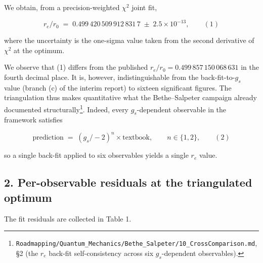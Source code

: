 \documentclass[
  11pt,
]{article}
\begin{document}
We obtain, from a precision-weighted \(\chi^2\) joint fit,

\[
r_e/r_0 \;=\; 0.499\,420\,509\,912\,831\,7 \;\pm\; 2.5\times 10^{-13},
\qquad (1)
\]

where the uncertainty is the one-sigma value taken from the second
derivative of \(\chi^2\) at the optimum.

We observe that (1) differs from the published
\(r_e/r_0 = 0.499\,857\,150\,068\,631\) in the fourth decimal place. It
is, however, indistinguishable from the back-fit-to-\(g_s\) value
(branch (c) of the interim report) to sixteen significant figures. The
triangulation thus makes quantitative what the Bethe--Salpeter campaign
already documented structurally\footnote{\texttt{Roadmapping/Quantum\_Mechanics/Bethe\_Salpeter/10\_CrossComparison.md},
  §2 (the \(r_e\) back-fit self-consistency across six \(g_s\)-dependent
  observables).}. Indeed, every \(g_s\)-dependent observable in the
framework satisfies

\[
\text{prediction} \;=\; (g_s / -2)^n \times \text{textbook}, \qquad n \in \{1, 2\},
\qquad (2)
\]

so a single back-fit applied to six observables yields a single \(r_e\)
value.

\hypertarget{per-observable-residuals-at-the-triangulated-optimum}{%
\subsection{2. Per-observable residuals at the triangulated
optimum}\label{per-observable-residuals-at-the-triangulated-optimum}}

The fit residuals are collected in Table 1.
\end{document}
